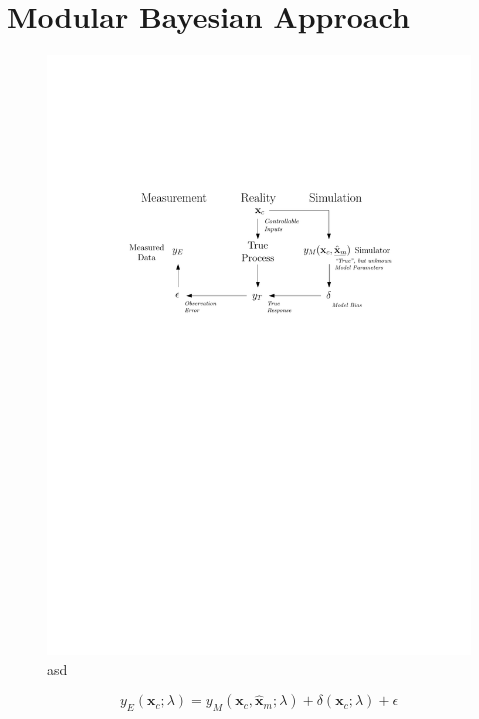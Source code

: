 \section{Modular Bayesian Approach}\label{sec:bc_modular_bayes}

\lipsum[10]
\begin{figure}[bth]	
	\centering
	\includegraphics[width=1.0\textwidth]{../figures/chapter5/figures/HMErrorModel}
	\caption[ad]{asd}
	\label{fig:ch5_hm_error_model}
\end{figure}

\begin{equation}
    y_E(\bm{x}_c; \lambda) = y_M (\bm{x}_c, \hat{\bm{x}}_m; \lambda) + \delta (\bm{x}_c; \lambda) + \epsilon
\label{eq:bc_additive_formulation}
\end{equation}

